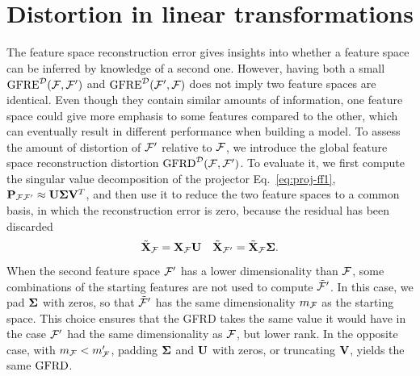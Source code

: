 \section{Distortion in linear transformations}
The feature space reconstruction error gives insights into whether a feature space can be inferred by knowledge of a second one. However, having both a small $\operatorname{GFRE}^{\mathcal{D}}(\mathcal{F},\mathcal{F}^\prime)$ and $\operatorname{GFRE}^{\mathcal{D}}(\mathcal{F}^\prime,\mathcal{F})$ does not imply two feature spaces are identical. Even though they contain similar amounts of information, one feature space could give more emphasis to some features compared to the other, which can eventually result in different performance when building a model.
To assess the amount of distortion of $\mathcal{F}^\prime$ relative to $\mathcal{F}$, we introduce the global feature space reconstruction distortion $\operatorname{GFRD}^{\mathcal{D}}(\mathcal{F},\mathcal{F}^\prime)$.
To evaluate it, we first compute the singular value decomposition of the projector Eq.~\eqref{eq:proj-ff1}, $\mathbf{P}_{{\mathcal{F}}{\mathcal{F}^\prime}}\approx\mathbf{U} \boldsymbol{\Sigma} \mathbf{V}^T$, and then use it to reduce the two feature spaces to a common basis, in which the reconstruction error is zero, because the residual has been discarded
\begin{equation}
{\tilde{\mathbf{X}}}_{\mathcal{F}} = \mathbf{X}_{\mathcal{F}}\mathbf{U} \quad  {\tilde{\mathbf{X}}}_{\mathcal{F}^\prime} = {\tilde{\mathbf{X}}}_{\mathcal{F}} \boldsymbol{\Sigma}.
\end{equation}
When the second feature space $\mathcal{F}^\prime$ has a lower dimensionality than $\mathcal{F}$, some combinations of the starting features are not used to compute $\tilde{\mathcal{F}}^\prime$. 
In this case, we pad $\boldsymbol{\Sigma}$ with zeros, so that $\tilde{\mathcal{F}}^\prime$ has the same dimensionality $m_{\mathcal{F}}$ as the starting space. This choice ensures that the GFRD takes the same value it would have in the case $\mathcal{F}^\prime$ had the same dimensionality as $\mathcal{F}$, but lower rank. 
In the opposite case, with $m_{\mathcal{F}}<m_{\mathcal{F}}^\prime$, padding $\boldsymbol{\Sigma}$ and $\mathbf{U}$ with zeros, or truncating $\mathbf{V}$, yields the same $\operatorname{GFRD}$.

